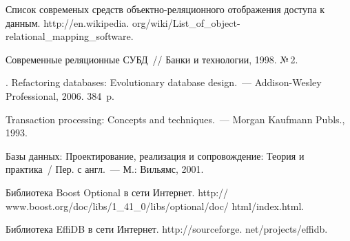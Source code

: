 \begin{multicols}{2}
{\small\frenchspacing
{%
\begin{thebibliography}{9}

Список современых средств объектно-ре\-ля\-ци\-он\-но\-го отображения доступа к данным.  {\sf 
http://en.wikipedia. org/wiki/List\_of\_object-relational\_mapping\_software}.

 Современные реляционные СУБД~// Банки и технологии, 1998. №\,2.

. Refactoring databases: Evolutionary 
database design.~--- Addison-Wesley Professional, 2006. 384~p.

 Transaction processing: Concepts and techniques.~--- Morgan 
Kaufmann Publs., 1993.

 Базы данных: Проектирование, реализация и 
сопровождение: Теория и практика~/ Пер. с англ.~--- М.: Вильямс, 2001.

Библиотека Boost Optional в сети Интернет. {\sf 
http:// www.boost.org/doc/libs/1\_41\_0/libs/optional/doc/ html/index.html}.

\label{end\stat}

Библиотека EffiDB в сети Интернет. {\sf http://sourceforge. net/projects/effidb}.
 \end{thebibliography}
}
}


\end{multicols}       